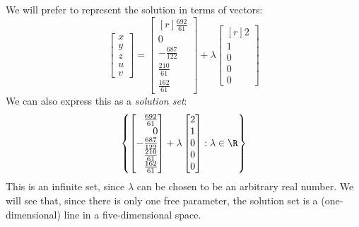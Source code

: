\documentclass[12pt]{article}
\begin{document}
\begin{example}
We will prefer to represent the solution in terms of vectors:
\[
\begin{bmatrix}x\\y\\z\\u\\v\end{bmatrix}=
\begin{bmatrix*}[r]\frac{692}{61}\\0\\- \frac{687}{122}\\\frac{210}{61}\\\frac{162}{61}\end{bmatrix*}+
\lambda
\begin{bmatrix*}[r]2\\1\\0\\0\\0\end{bmatrix*}
\]
We can also express this as a \emph{solution set}:
\[
\left\{
\begin{bmatrix*}[r]\frac{692}{61}\\0\\- \frac{687}{122}\\\frac{210}{61}\\\frac{162}{61}\end{bmatrix*}+
\lambda
\begin{bmatrix*}[r]2\\1\\0\\0\\0\end{bmatrix*}
:\lambda \in \R\right\}
\]
This is an infinite set, since $\lambda$ can be chosen to be an arbitrary real number. We will see that, since there is only one free parameter, the solution set is a (one-dimensional) line in a five-dimensional space.
 

\end{example}
\end{document}
